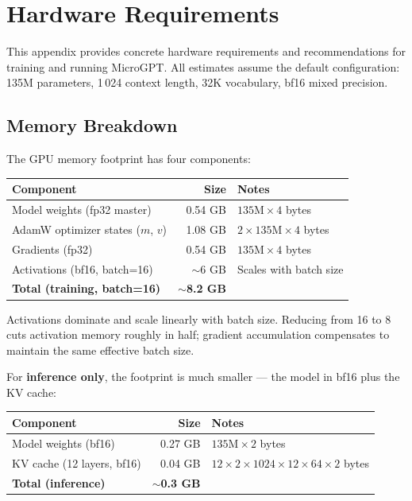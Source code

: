 \chapter{Hardware Requirements}
\label{app:hardware}

This appendix provides concrete hardware requirements and recommendations for
training and running MicroGPT.  All estimates assume the default configuration:
135M parameters, 1\,024 context length, 32K vocabulary, bf16 mixed precision.


\section{Memory Breakdown}

The GPU memory footprint has four components:

\begin{center}
\begin{tabular}{lrl}
\toprule
Component & Size & Notes \\
\midrule
Model weights (fp32 master) & 0.54 GB & $135\text{M} \times 4$ bytes \\
AdamW optimizer states ($m$, $v$) & 1.08 GB & $2 \times 135\text{M} \times 4$ bytes \\
Gradients (fp32) & 0.54 GB & $135\text{M} \times 4$ bytes \\
Activations (bf16, batch=16) & $\sim$6 GB & Scales with batch size \\
\midrule
\textbf{Total (training, batch=16)} & $\sim$\textbf{8.2 GB} & \\
\bottomrule
\end{tabular}
\end{center}

Activations dominate and scale linearly with batch size.  Reducing
 from 16 to 8 cuts activation memory roughly in half;
gradient accumulation compensates to maintain the same effective batch size.

For \textbf{inference only}, the footprint is much smaller --- the model in bf16
plus the KV cache:

\begin{center}
\begin{tabular}{lrl}
\toprule
Component & Size & Notes \\
\midrule
Model weights (bf16) & 0.27 GB & $135\text{M} \times 2$ bytes \\
KV cache (12 layers, bf16) & 0.04 GB & $12 \times 2 \times 1024 \times 12 \times 64 \times 2$ bytes \\
\midrule
\textbf{Total (inference)} & $\sim$\textbf{0.3 GB} & \\
\bottomrule
\end{tabular}
\end{center}


